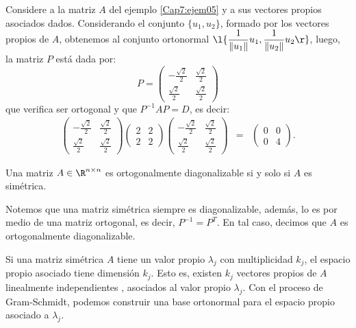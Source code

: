 \documentclass[compacto,10pt]{pubciencias-notas}
\begin{document}
\begin{ejem}\hspace{0pt} Considere a la matriz $A$ del ejemplo  \ref{Cap7:ejem05} y a sus vectores propios asociados dados. Considerando el conjunto $\{u_{1}, u_{2}\}$, formado por los vectores propios de $A$, obtenemos al conjunto ortonormal $\l\{\dfrac{1}{\|u_{1}\|}u_{1}, \dfrac{1}{\|u_{2}\|}u_{2}\r\}$, luego, la matriz $P$ está dada por:
\[
    P = \begin{pmatrix}
-\frac{\sqrt{2}}{2}&\frac{\sqrt{2}}{2}\\
    \frac{\sqrt{2}}{2}&\frac{\sqrt{2}}{2}
    \end{pmatrix}
\]
que verifica ser ortogonal y que $P^{-1}AP=D$, es decir:
\begin{eqnarray*}
\begin{pmatrix}
-\frac{\sqrt{2}}{2}&\frac{\sqrt{2}}{2}\\
\frac{\sqrt{2}}{2}&\frac{\sqrt{2}}{2}
\end{pmatrix}
 \begin{pmatrix}2&2\\2&2\end{pmatrix}
 \begin{pmatrix}
-\frac{\sqrt{2}}{2}&\frac{\sqrt{2}}{2}\\
\frac{\sqrt{2}}{2}&\frac{\sqrt{2}}{2}
\end{pmatrix}&=&
\begin{pmatrix}0&0\\0&4\end{pmatrix}.
\end{eqnarray*}
\end{ejem}

\begin{teo}
Una matriz $A\in\R^{n\times n}$ es ortogonalmente diagonalizable si y solo si $A$ es sim\'etrica.
\end{teo}

\begin{obs}
Notemos que una matriz simétrica siempre es diagonalizable, además, lo es por medio de una matriz ortogonal, es decir, $P^{-1}=P^{T}$. En tal caso, decimos que $A$ es ortogonalmente diagonalizable.
\end{obs}

\begin{obs}
Si una matriz simétrica $A$ tiene un valor propio $\lambda_{j}$ con multiplicidad $k_{j}$, el espacio propio asociado tiene dimensión $k_{j}$. Esto es, existen $k_{j}$ vectores propios de $A$ linealmente independientes , asociados al valor propio $\lambda_{j}$. Con el proceso de Gram-Schmidt, podemos construir una base ortonormal para el espacio propio asociado a $\lambda_{j}$.
\end{obs}
\end{document}

